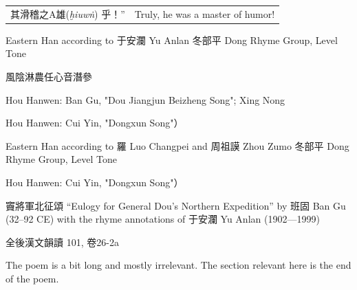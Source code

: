 \begin{longtable}{p{} p{}}
其滑稽之A雄(\textit{ḫiuwṅ})
乎！'' & Truly, he was a master of humor! %
\\





\end{longtable}







Eastern Han according to 于安瀾 Yu Anlan 
冬部平 Dong Rhyme Group, Level Tone

風陰淋農任心音潛參 

Hou Hanwen: Ban Gu, "Dou Jiangjun Beizheng Song"; Xing Nong 

Hou Hanwen: Cui Yin, "Dongxun Song"）

Eastern Han according to 羅 Luo Changpei and 周祖謨 Zhou Zumo
冬部平 Dong Rhyme Group, Level Tone


Hou Hanwen: Cui Yin, "Dongxun Song"）


竇將軍北征頌 ``Eulogy for General Dou's Northern Expedition''
by 班固 Ban Gu (32–92 CE) 
with the rhyme annotations of 
于安瀾 
Yu Anlan
(1902—1999)


全後漢文韻讀 101,  %
卷26-2a

The poem is a bit long and mostly irrelevant. The section relevant here is the end of the poem.  

